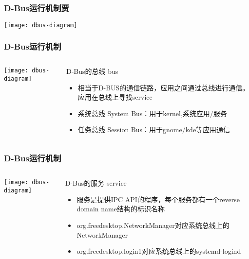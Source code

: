 \begin{frame}[plain]
	\frametitle{D-Bus运行机制贾}
	\centering
				\texttt{[image: dbus-diagram]}

\end{frame}
\begin{frame}[fragile]
	\frametitle{D-Bus运行机制}
	
	\begin{columns}
		\begin{column}{.4\textwidth}
			
			\texttt{[image: dbus-diagram]}
			
		\end{column}
		\begin{column}{.6\textwidth}
			D-Bus的总线 bus
			\begin{itemize}
				\item 相当于D-BUS的通信链路，应用之间通过总线进行通信。应用在总线上寻找service
				\item 系统总线 System Bus：用于kernel,系统应用/服务
				\item 任务总线 Session Bus：用于gnome/kde等应用通信
				
			\end{itemize}
		\end{column}
	\end{columns}
\end{frame}

\begin{frame}[fragile]
	\frametitle{D-Bus运行机制}
	
	\begin{columns}
		\begin{column}{.4\textwidth}
			
			\texttt{[image: dbus-diagram]}
			
		\end{column}
		\begin{column}{.6\textwidth}
			D-Bus的服务 service
			\begin{itemize}
				\item 服务是提供IPC API的程序，每个服务都有一个reverse domain name结构的标识名称
				\item org.freedesktop.NetworkManager对应系统总线上的NetworkManager
				\item org.freedesktop.login1对应系统总线上的systemd-logind
				
			\end{itemize}
		\end{column}
	\end{columns}
\end{frame}

